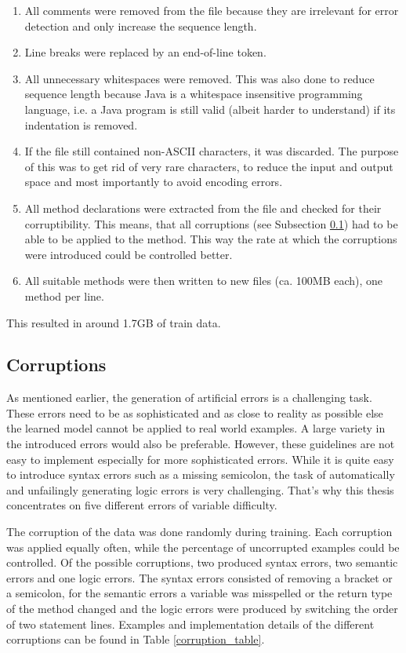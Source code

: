 \begin{enumerate}
  \item All comments were removed from the file because they are irrelevant for error detection and only increase the sequence length.
  \item Line breaks were replaced by an end-of-line token.
  \item All unnecessary whitespaces were removed. This was also done to reduce sequence length because Java is a whitespace insensitive programming language, i.e. a Java program is still valid (albeit harder to understand) if its indentation is removed.
  \item If the file still contained non-ASCII characters, it was discarded. The purpose of this was to get rid of very rare characters, to reduce the input and output space and most importantly to avoid encoding errors.
  \item All method declarations were extracted from the file and checked for their corruptibility. This means, that all corruptions (see Subsection \ref{corruption}) had to be able to be applied to the method. This way the rate at which the corruptions were introduced could be controlled better.
  \item All suitable methods were then written to new files (ca. 100MB each), one method per line.
\end{enumerate}

This resulted in around 1.7GB of train data.

\subsection{Corruptions}
\label{corruption}

As mentioned earlier, the generation of artificial errors is a challenging task. These errors need to be as sophisticated and as close to reality as possible else the learned model cannot be applied to real world examples. A large variety in the introduced errors would also be preferable. However, these guidelines are not easy to implement especially for more sophisticated errors. While it is quite easy to introduce syntax errors such as a missing semicolon, the task of automatically and unfailingly generating logic errors is very challenging. That's why this thesis concentrates on five different errors of variable difficulty.

The corruption of the data was done randomly during training. Each corruption was applied equally often, while the percentage of uncorrupted examples could be controlled. Of the possible corruptions, two produced syntax errors, two semantic errors and one logic errors. The syntax errors consisted of removing a bracket or a semicolon, for the semantic errors a variable was misspelled or the return type of the method changed and the logic errors were produced by switching the order of two statement lines. Examples and implementation details of the different corruptions can be found in Table \ref{corruption_table}.


